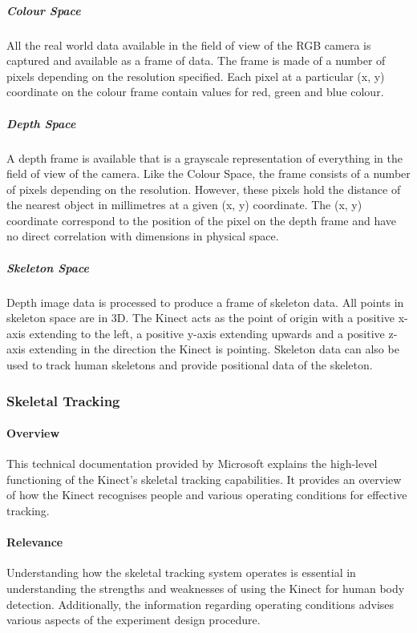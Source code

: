 \subparagraph{Colour Space}
All the real world data available in the field of view of the RGB camera is captured and available as a frame of data. The frame is made of a number of pixels depending on the resolution specified. Each pixel at a particular (x, y) coordinate on the colour frame contain values for red, green and blue colour.

\subparagraph{Depth Space}
A depth frame is available that is a grayscale representation of everything in the field of view of the camera. Like the Colour Space, the frame consists of a number of pixels depending on the resolution. However, these pixels hold the distance of the nearest object in millimetres at a given (x, y) coordinate. The (x, y) coordinate correspond to the position of the pixel on the depth frame and have no direct correlation with dimensions in physical space.
	
\subparagraph{Skeleton Space}
Depth image data is processed to produce a frame of skeleton data. All points in skeleton space are in 3D. The Kinect acts as the point of origin with a positive x-axis extending to the left, a positive y-axis extending upwards and a positive z-axis extending in the direction the Kinect is pointing. Skeleton data can also be used to track human skeletons and provide positional data of the skeleton.

\subsubsection{Skeletal Tracking \cite{msdnSkelTrack2017}}

\paragraph{Overview}
This technical documentation provided by Microsoft explains the high-level functioning of the Kinect's skeletal tracking capabilities. It provides an overview of how the Kinect recognises people and various operating conditions for effective tracking.

\paragraph{Relevance}
Understanding how the skeletal tracking system operates is essential in understanding the strengths and weaknesses of using the Kinect for human body detection. Additionally, the information regarding operating conditions advises various aspects of the experiment design procedure. 


